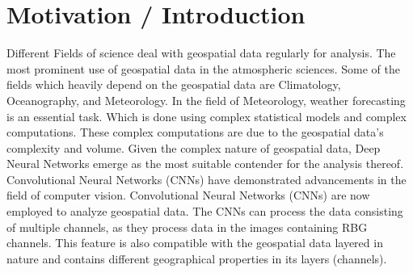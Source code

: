 \clearpage
\cleardoublepage

\chapter{Motivation / Introduction}

Different Fields of science deal with geospatial data regularly for analysis.
The most prominent use of geospatial data in the atmospheric sciences. Some of the fields
which heavily depend on the geospatial data are Climatology, Oceanography, and Meteorology.
In the field of Meteorology, weather forecasting is an essential task. Which is done using complex statistical models and complex computations. These complex computations are due to the geospatial data's
complexity and volume. Given the complex nature of geospatial data,
Deep Neural Networks emerge as the most suitable contender for the analysis thereof. Convolutional Neural Networks (CNNs) have demonstrated advancements in the field of computer
vision. Convolutional Neural Networks (CNNs) are now employed to analyze geospatial data. The CNNs can process the data consisting of multiple channels, as they process
data in the images containing RBG channels. This feature is also compatible with the geospatial data layered in nature and contains different geographical properties in its layers (channels).


